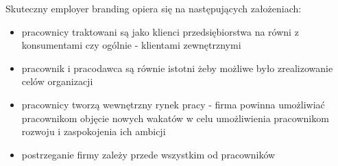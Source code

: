Skuteczny employer branding opiera się na następujących założeniach:
\begin{itemize}
    \item pracownicy traktowani są jako klienci przedsiębiorstwa na równi z konsumentami czy ogólnie - klientami zewnętrznymi
    \item pracownik i pracodawca są równie istotni żeby możliwe było zrealizowanie celów organizacji
    \item pracownicy tworzą wewnętrzny rynek pracy - firma powinna umożliwiać pracownikom objęcie nowych wakatów w celu umożliwienia pracownikom rozwoju i zaspokojenia ich ambicji
    \item postrzeganie firmy zależy przede wszystkim od pracowników
\end{itemize}

